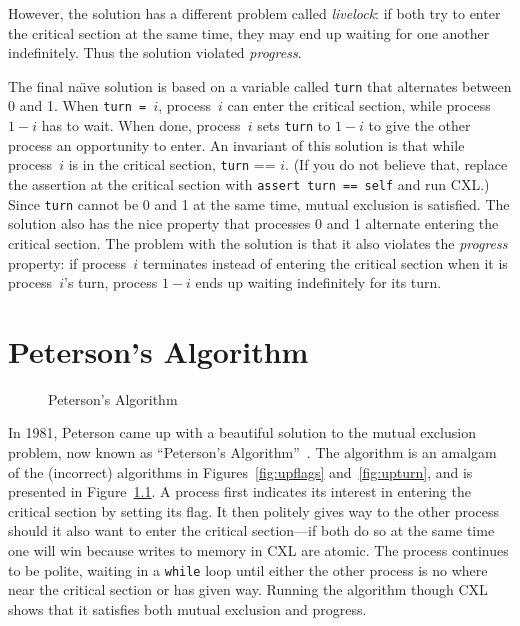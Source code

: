\documentclass{report}
\newenvironment{code}{
\tcolorbox
}{
\endtcolorbox
}
\begin{document}
However, the solution has a different problem called \emph{livelock}:
if both try to enter the critical section at the same time, they may
end up waiting for one another indefinitely.  Thus the solution
violated \emph{progress}.

The final na\"{\i}ve solution is based on a variable called \texttt{turn}
that alternates between 0 and 1.  When \texttt{turn = $i$}, process~$i$ can
enter the critical section, while process $1-i$ has to wait.  When done,
process~$i$ sets \texttt{turn} to $1-i$ to give the other process an
opportunity to enter.
An invariant of this solution is that while process~$i$ is in the critical
section, \texttt{turn} == $i$.
(If you do not believe that, replace the assertion at the critical
section with \texttt{assert turn == self} and run CXL.)
Since \texttt{turn} cannot be 0 and 1 at
the same time, mutual exclusion is satisfied.
The solution also has the nice property that
processes 0 and 1 alternate entering the critical section.
The problem with the solution is
that it also violates the \emph{progress} property:
if process~$i$ terminates instead of entering the critical section when it
is process~$i$'s turn, process $1-i$ ends up waiting indefinitely for its
turn.

\chapter{Peterson's Algorithm}
\label{ch:peterson}

\begin{figure}
\begin{code}

\end{code}
\caption{Peterson's Algorithm}
\label{fig:peterson}
\end{figure}

In 1981, Peterson came up with a beautiful solution to the mutual exclusion
problem, now known as ``Peterson's Algorithm''~\cite{Peterson81}.
The algorithm is an amalgam of the (incorrect) algorithms in
Figures~\ref{fig:upflags} and~\ref{fig:upturn}, and is presented
in Figure~\ref{fig:peterson}.
A process first indicates its interest in entering the critical section
by setting its flag.
It then politely gives way to the other process should it also want to
enter the critical section---if both do so at the same time one will
win because writes to memory in CXL are atomic.
The process continues to be polite, waiting in a \texttt{while} loop
until either the other process is no where near the critical section
or has given way.
Running the algorithm though CXL shows that it satisfies both mutual
exclusion and progress.
\end{document}
